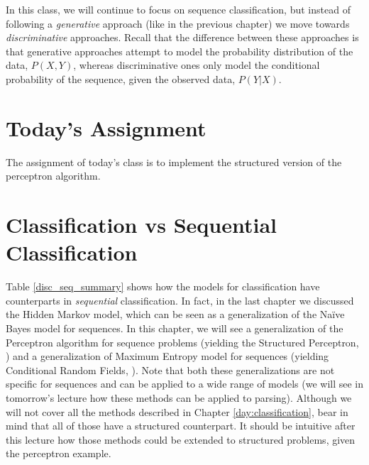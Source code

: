 In this class, we will continue to focus on sequence classification,
but instead of following a \emph{generative} approach (like in the previous
chapter) we move towards \emph{discriminative} approaches. Recall that the difference between these approaches is that generative approaches attempt to model the probability distribution of the data, $P(X,Y)$, whereas discriminative ones only model the conditional probability of the sequence, given the observed data, $P(Y|X)$.



\section*{Today's Assignment}

The assignment of today's class is to implement the structured version of the perceptron algorithm.

\section{Classification vs Sequential Classification}


Table \ref{disc_seq_summary} shows how the models for classification 
have counterparts in \emph{sequential} classification. In fact, in
the last chapter we discussed the Hidden Markov model, which can be seen as a
generalization of the Na\"{i}ve Bayes model for sequences. 
In this chapter, we will see a generalization of the
Perceptron algorithm for sequence problems (yielding the Structured
Perceptron, \citealt{collins2002discriminative}) and a generalization of
Maximum Entropy model for sequences (yielding Conditional Random Fields, \citealt{lafferty2001conditional}). 
Note that both these generalizations are  not specific for sequences
and can be applied to a wide range of models (we will see in tomorrow's
lecture how these methods can be applied to parsing).
Although we will not cover all the methods described in
Chapter \ref{day:classification}, bear in mind that all of those have a structured counterpart. 
It should be intuitive after this lecture how those methods could be
extended to structured problems, given the perceptron example.

